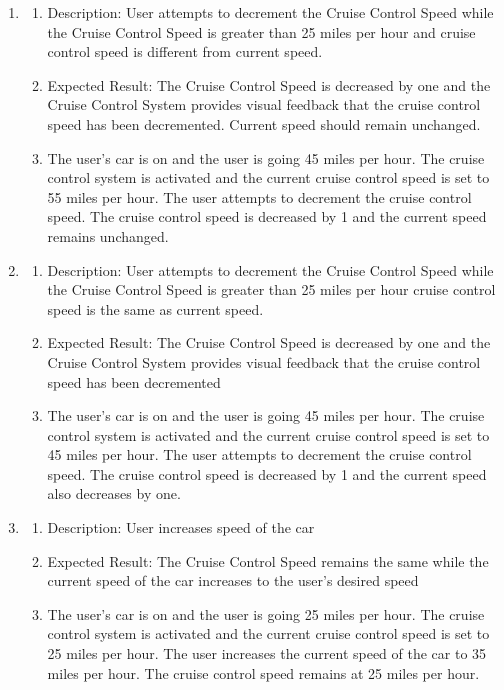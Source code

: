 \documentclass[preprint,11pt,3p]{article}
\begin{document}
\begin{enumerate}
	\item 
		\begin{enumerate}
	\item Description: User attempts to decrement the Cruise Control Speed while the Cruise Control Speed is greater than 25 miles per hour and cruise control speed is different from current speed.
	\item Expected Result: The Cruise Control Speed is decreased by one and the Cruise Control System provides visual feedback that the cruise control speed has been decremented. Current speed should remain unchanged.
	\item The user’s car is on and the user is going 45 miles per hour. The cruise control system is activated and the current cruise control speed is set to 55 miles per hour. The user attempts to decrement the cruise control speed. The cruise control speed is decreased by 1 and the current speed remains unchanged.
\end{enumerate}

	\item
		\begin{enumerate}
	\item Description: User attempts to decrement the Cruise Control Speed while the Cruise Control Speed is greater than 25 miles per hour cruise control speed is the same as current speed.
	\item Expected Result: The Cruise Control Speed is decreased by one and the Cruise Control System provides visual feedback that the cruise control speed has been decremented
	\item The user’s car is on and the user is going 45 miles per hour. The cruise control system is activated and the current cruise control speed is set to 45 miles per hour. The user attempts to decrement the cruise control speed. The cruise control speed is decreased by 1 and the current speed also decreases by one.
\end{enumerate}

	\item 
		\begin{enumerate}
	\item Description: User increases speed of the car
	\item Expected Result: The Cruise Control Speed remains the same while the current speed of the car increases to the user’s desired speed
	\item The user’s car is on and the user is going 25 miles per hour. The cruise control system is activated and the current cruise control speed is set to 25 miles per hour. The user increases the current speed of the car to 35 miles per hour. The cruise control speed remains at 25 miles per hour. 
\end{enumerate}


\end{enumerate}
\end{document}
